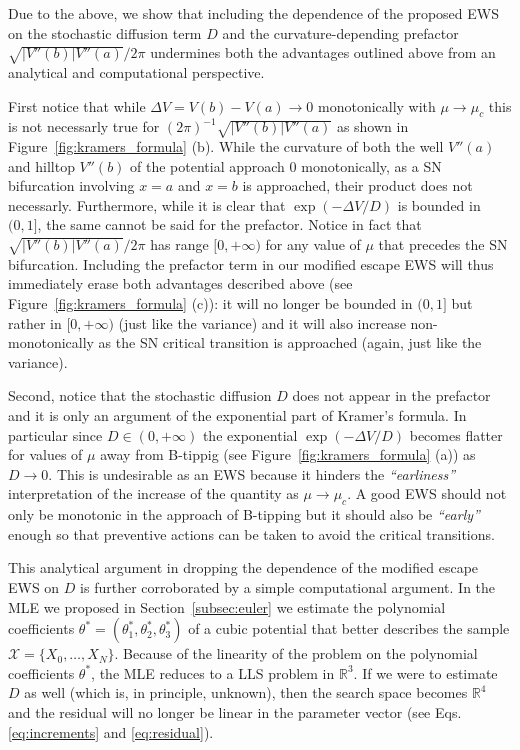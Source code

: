 \documentclass[a4paper,fleqn]{cas-sc}
\newcommand{\sref}[1]{Section~\ref{#1}}
\newcommand{\fref}[1]{Figure~\ref{#1}}
\begin{document}
Due to the above, we show that including the dependence of the proposed EWS on the stochastic diffusion term $D$ and the curvature-depending prefactor $\sqrt{|V''(b)|V''(a)}/2\pi$ undermines both the advantages outlined above from an analytical and computational perspective.

First notice that while $\Delta V = V(b) - V(a)\to0$ monotonically with $\mu\to\mu_c$ this is not necessarly true for $(2\pi)^{-1}\sqrt{|V''(b)|V''(a)}$ as shown in \fref{fig:kramers_formula} (b).
While the curvature of both the well $V''(a)$ and hilltop $V''(b)$ of the potential approach $0$ monotonically, as a SN bifurcation involving $x=a$ and $x=b$ is approached, their product does not necessarly.
Furthermore, while it is clear that $\exp(-\Delta V/D)$ is bounded in $(0,1]$, the same cannot be said for the prefactor.
Notice in fact that $\sqrt{|V''(b)|V''(a)}/2\pi$ has range $[0,+\infty)$ for any value of $\mu$ that precedes the SN bifurcation.
Including the prefactor term in our modified escape EWS will thus immediately erase both advantages described above (see \fref{fig:kramers_formula} (c)): it will no longer be bounded in $(0,1]$ but rather in $[0,+\infty)$ (just like the variance) and it will also increase non-monotonically as the SN critical transition is approached (again, just like the variance).

Second, notice that the stochastic diffusion $D$ does not appear in the prefactor and it is only an argument of the exponential part of Kramer's formula.
In particular since $D\in(0,+\infty)$ the exponential $\exp(-\Delta V/D)$ becomes flatter for values of $\mu$ away from B-tippig (see \fref{fig:kramers_formula} (a)) as $D\to0$.
This is undesirable as an EWS because it hinders the \textit{``earliness''} interpretation of the increase of the quantity as $\mu\to\mu_c$.
A good EWS should not only be monotonic in the approach of B-tipping but it should also be \textit{``early''} enough so that preventive actions can be taken to avoid the critical transitions.

This analytical argument in dropping the dependence of the modified escape EWS on $D$ is further corroborated by a simple computational argument.
In the MLE we proposed in \sref{subsec:euler} we estimate the polynomial coefficients $\theta^* = (\theta_1^*,\theta_2^*,\theta_3^*)$ of a cubic potential that better describes the sample $\mathcal{X}=\{X_0,\dots,X_N\}$.
Because of the linearity of the problem on the polynomial coefficients $\theta^*$, the MLE reduces to a LLS problem in $\mathbb{R}^{3}$.
If we were to estimate $D$ as well (which is, in principle, unknown), then the search space becomes $\mathbb{R}^{4}$ and the residual will no longer be linear in the parameter vector (see Eqs. \eqref{eq:increments} and \eqref{eq:residual}).
\end{document}
